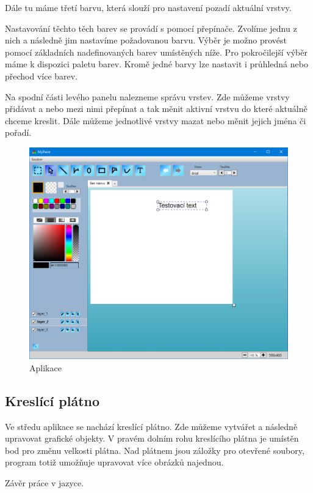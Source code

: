 \documentclass[
  field=inf,
  biblatex,
  glossaries,
  index
]{kidiplom}
\begin{document}
Dále tu máme třetí barvu, která slouží pro nastavení pozadí aktuální vrstvy.

Nastavování těchto těch barev se provádí s pomocí přepínače. Zvolíme jednu z nich a následně jim nastavíme požadovanou barvu. Výběr je možno provést pomocí základních nadefinovaných barev umístěných níže. Pro pokročilejší výběr máme k dispozici paletu barev. Kromě jedné barvy lze nastavit i průhledná nebo přechod více barev.

Na spodní části levého panelu nalezneme správu vrstev. Zde můžeme vrstvy přidávat a nebo mezi nimi přepínat a tak měnit aktivní vrstvu do které aktuálně chceme kreslit. Dále můžeme jednotlivé vrstvy mazat nebo měnit jejich jména či pořadí.

\begin{figure}
\includegraphics[width=15cm]{img/program}
\caption{Aplikace}
\end{figure}  

\subsection{Kreslící plátno}

Ve středu aplikace se nachází kreslící plátno. Zde můžeme vytvářet a následně upravovat grafické objekty. V pravém dolním rohu kreslícího plátna je umístěn bod pro změnu velkosti plátna. Nad plátnem jsou záložky pro otevřené soubory, program totiž umožňuje upravovat více obrázků najednou.




\begin{kiconclusions}
Závěr práce v  jazyce.
\end{kiconclusions}
\end{document}
